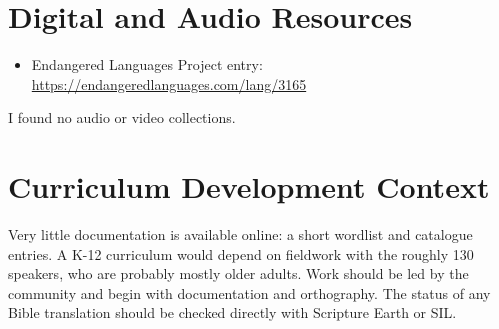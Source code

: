 \documentclass[12pt]{article}
\begin{document}
\section{Digital and Audio Resources}
\begin{itemize}
\item Endangered Languages Project entry: \url{https://endangeredlanguages.com/lang/3165}
\end{itemize}
I found no audio or video collections.

\section{Curriculum Development Context}
Very little documentation is available online: a short wordlist and catalogue entries. A K-12 curriculum would depend on fieldwork with the roughly 130 speakers, who are probably mostly older adults. Work should be led by the community and begin with documentation and orthography. The status of any Bible translation should be checked directly with Scripture Earth or SIL.
\end{document}
